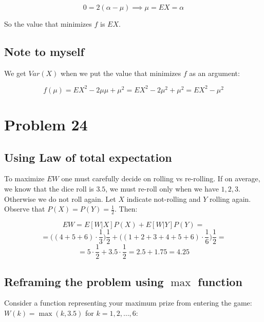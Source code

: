 \documentclass{article}
\begin{document}
\begin{equation*}
    0 = 2(\alpha - \mu) \implies \mu = EX = \alpha
\end{equation*}

So the value that minimizes \(f\) is \(EX\).

\subsection*{Note to myself}

We get \(Var(X)\) when we put the value that minimizes \(f\) as an argument:

\begin{equation*}
    f(\mu) = EX^{2} - 2 \mu \mu + \mu^{2} = EX^{2} - 2 \mu^{2} + \mu^{2} =  EX^{2} - \mu^{2} 
\end{equation*}


\section*{Problem 24}

\subsection*{Using Law of total expectation}

To maximize \(EW\) one must carefully decide on rolling vs re-rolling. If on average, we know
that the dice roll is \(3.5\), we must re-roll only when we have \(1, 2, 3\). Otherwise we
do not roll again. Let \(X\) indicate not-rolling and \(Y\) rolling again.
Observe that \(P(X) = P(Y) = \frac{1}{2}\).
Then:

\begin{equation*}
    EW = E[W|X]P(X) + E[W|Y]P(Y) = 
\end{equation*}
\begin{equation*}
    = \Big((4 + 5 + 6) \cdot \frac{1}{3}\Big)\frac{1}{2} + \Big((1 + 2 + 3 + 4 + 5 + 6) \cdot \frac{1}{6}\Big)\frac{1}{2} =
\end{equation*}
\begin{equation*}
    = 5 \cdot \frac{1}{2} + 3.5 \cdot \frac{1}{2} = 2.5 + 1.75 = 4.25
\end{equation*}

\subsection*{Reframing the problem using \(\max\) function}


Consider a function representing your maximum prize from entering the game: \(W(k) = \max(k, 3.5)\) for \(k = 1, 2, \dots, 6\):
\end{document}
